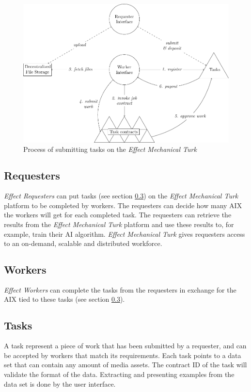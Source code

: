 \documentclass{article}
\begin{document}
\begin{figure}[htb]
  \includegraphics[width=\textwidth]{pictures/emt.pdf}
  \caption{Process of submitting tasks on the \emph{Effect Mechanical Turk}}
\end{figure}

\subsection{Requesters}
\label{subsec:requesters}
\emph{Effect Requesters} can put tasks (see section
\ref{subsec:tasks}) on the \emph{Effect Mechanical Turk} platform to
be completed by workers. The requesters can decide how many AIX the
workers will get for each completed task. The requesters can retrieve
the results from the \emph{Effect Mechanical Turk} platform and use
these results to, for example, train their AI algorithm. \emph{Effect
  Mechanical Turk} gives requesters access to an on-demand, scalable
and distributed workforce.

\subsection{Workers}
\emph{Effect Workers} can complete the tasks from the requesters in
exchange for the AIX tied to these tasks (see section
\ref{subsec:tasks}).

\subsection{Tasks}
\label{subsec:tasks}
A task represent a piece of work that has been submitted by a requester, 
and can be accepted by workers that match its requirements.
Each task points to a data set that can contain any amount of media
assets. The contract ID of the task will validate the format of the
data. Extracting and presenting examples from the data set is done by
the user interface.
\end{document}
